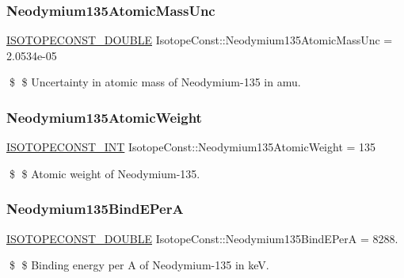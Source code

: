 \subsubsection{\texorpdfstring{Neodymium135\+Atomic\+Mass\+Unc}{Neodymium135AtomicMassUnc}}
{\footnotesize\ttfamily \mbox{\hyperlink{group___isotope_const-_macros_ga8f45a7272ce02c0b4c65c44636ed719a}{I\+S\+O\+T\+O\+P\+E\+C\+O\+N\+S\+T\+\_\+\+D\+O\+U\+B\+LE}} Isotope\+Const\+::\+Neodymium135\+Atomic\+Mass\+Unc = 2.\+0534e-\/05}

\$ \$ Uncertainty in atomic mass of Neodymium-\/135 in amu. \mbox{\label{group___isotope_const-_neodymium-_nd135_ga070e848fa5adbd1f2c95a80e5320ab3d}} 
\subsubsection{\texorpdfstring{Neodymium135\+Atomic\+Weight}{Neodymium135AtomicWeight}}
{\footnotesize\ttfamily \mbox{\hyperlink{group___isotope_const-_macros_ga5f18360b3e99483a35c32d789e62621c}{I\+S\+O\+T\+O\+P\+E\+C\+O\+N\+S\+T\+\_\+\+I\+NT}} Isotope\+Const\+::\+Neodymium135\+Atomic\+Weight = 135}

\$ \$ Atomic weight of Neodymium-\/135. \mbox{\label{group___isotope_const-_neodymium-_nd135_ga1bcc259afee1f998e7635fba8abe853b}} 
\subsubsection{\texorpdfstring{Neodymium135\+Bind\+E\+PerA}{Neodymium135BindEPerA}}
{\footnotesize\ttfamily \mbox{\hyperlink{group___isotope_const-_macros_ga8f45a7272ce02c0b4c65c44636ed719a}{I\+S\+O\+T\+O\+P\+E\+C\+O\+N\+S\+T\+\_\+\+D\+O\+U\+B\+LE}} Isotope\+Const\+::\+Neodymium135\+Bind\+E\+PerA = 8288.}

\$ \$ Binding energy per A of Neodymium-\/135 in keV. \mbox{\label{group___isotope_const-_neodymium-_nd135_gac88ae59c9e82f68fabd3d3892f62709c}} 
